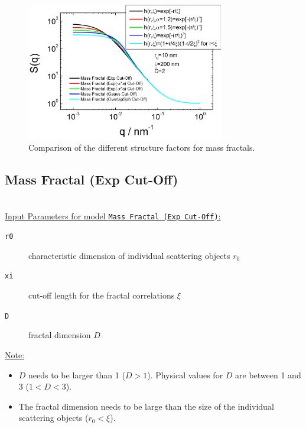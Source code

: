 \begin{figure}[htb]
\begin{center}
\includegraphics[width=0.768\textwidth]{../images/structure_factor/MassFractals/ComparingSQMassFractals.png}
\end{center}
\caption{Comparison of the different structure factors for mass
fractals.} \label{fig:MassFractCompare}
\end{figure}


\clearpage
\subsection{Mass Fractal (Exp Cut-Off)}
~\\

\underline{Input Parameters for model \texttt{Mass Fractal (Exp Cut-Off)}:}
\begin{description}
\item[\texttt{r0}] characteristic dimension of individual scattering objects $r_0$
\item[\texttt{xi}] cut-off length for the fractal correlations $\xi$
\item[\texttt{D}] fractal dimension $D$
\end{description}

\underline{Note:}
\begin{itemize}
\item $D$ needs to be larger than 1 ($D>1$). Physical values for $D$ are between 1 and 3 ($1<D<3$).
\item The fractal dimension needs to be large than the size of the individual scattering objects ($r_0 < \xi$).
\end{itemize}

